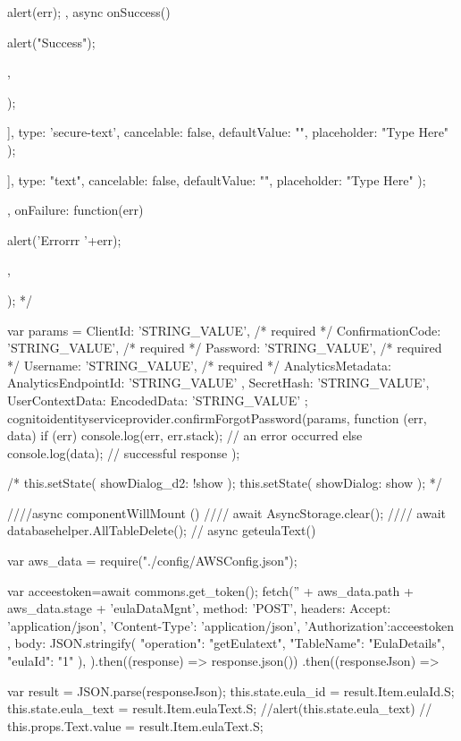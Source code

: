 {{{{{{{{{{{{                                      alert(err);
                                  },
                                 async onSuccess() {
                                   
                                      alert("Success");
                                  },
                              });
                              }
                            }
                          ],
                          {
                            type: 'secure-text',
                            cancelable: false,
                            defaultValue: "",
                            placeholder: "Type Here"
                          }
                        );
                      }
                    }
                  ],
                  {
                    type: "text",
                    cancelable: false,
                    defaultValue: "",
                    placeholder: "Type Here"
                  }
                );
              },
              onFailure: function(err) {
              
                
                alert('Errorrr '+err);
            },
            });  */

    var params = {
      ClientId: 'STRING_VALUE', /* required */
      ConfirmationCode: 'STRING_VALUE', /* required */
      Password: 'STRING_VALUE', /* required */
      Username: 'STRING_VALUE', /* required */
      AnalyticsMetadata: {
        AnalyticsEndpointId: 'STRING_VALUE'
      },
      SecretHash: 'STRING_VALUE',
      UserContextData: {
        EncodedData: 'STRING_VALUE'
      }
    };
    cognitoidentityserviceprovider.confirmForgotPassword(params, function (err, data) {
      if (err) console.log(err, err.stack); // an error occurred
      else console.log(data);           // successful response
    });





    /*  this.setState({ showDialog_d2: !show });
      this.setState({ showDialog: show }); */

  }

  ////async componentWillMount (){
  //// await AsyncStorage.clear();    
  //// await databasehelper.AllTableDelete();
  //}
  async geteulaText() {
    var aws_data = require("./config/AWSConfig.json");
    
    var acceestoken=await commons.get_token();
    fetch('' + aws_data.path + aws_data.stage + 'eulaDataMgnt', {
      method: 'POST',
      headers: {
        Accept: 'application/json',
        'Content-Type': 'application/json',
        'Authorization':acceestoken
      },
      body: JSON.stringify({
        "operation": "getEulatext",
        "TableName": "EulaDetails",
        "eulaId": "1"
      }),
    }).then((response) => response.json())
      .then((responseJson) => {
        var result = JSON.parse(responseJson);
        this.state.eula_id = result.Item.eulaId.S;
        this.state.eula_text = result.Item.eulaText.S;
        //alert(this.state.eula_text)
        //  this.props.Text.value = result.Item.eulaText.S;

}}}}}
